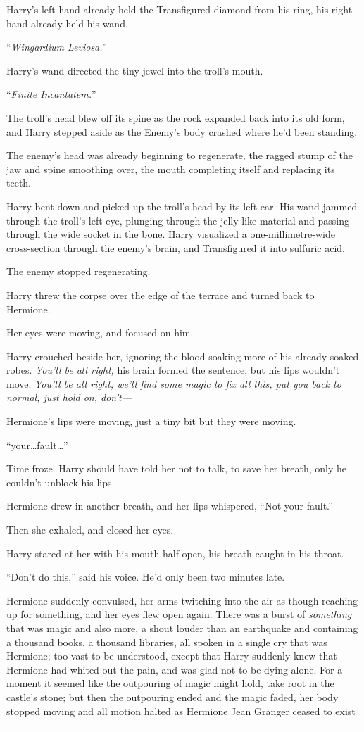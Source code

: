 Harry’s left hand already held the Transfigured diamond from his ring, his right hand already held his wand.

“\emph{Wingardium Leviosa.}”

Harry’s wand directed the tiny jewel into the troll’s mouth.

“\emph{Finite Incantatem.}”

The troll’s head blew off its spine as the rock expanded back into its old form, and Harry stepped aside as the Enemy’s body crashed where he’d been standing.

The enemy’s head was already beginning to regenerate, the ragged stump of the jaw and spine smoothing over, the mouth completing itself and replacing its teeth.

Harry bent down and picked up the troll’s head by its left ear. His wand jammed through the troll’s left eye, plunging through the jelly-like material and passing through the wide socket in the bone. Harry visualized a one-millimetre-wide cross-section through the enemy’s brain, and Transfigured it into sulfuric acid.

The enemy stopped regenerating.

Harry threw the corpse over the edge of the terrace and turned back to Hermione.

Her eyes were moving, and focused on him.

Harry crouched beside her, ignoring the blood soaking more of his already-soaked robes. \emph{You’ll be all right,} his brain formed the sentence, but his lips wouldn’t move. \emph{You’ll be all right, we’ll find some magic to fix all this, put you back to normal, just hold on, don’t—}

Hermione’s lips were moving, just a tiny bit but they were moving.

“your…fault…”

Time froze. Harry should have told her not to talk, to save her breath, only he couldn’t unblock his lips.

Hermione drew in another breath, and her lips whispered, “Not your fault.”

Then she exhaled, and closed her eyes.

Harry stared at her with his mouth half-open, his breath caught in his throat.

“Don’t do this,” said his voice. He’d only been two minutes late.

Hermione suddenly convulsed, her arms twitching into the air as though reaching up for something, and her eyes flew open again. There was a burst of \emph{something} that was magic and also more, a shout louder than an earthquake and containing a thousand books, a thousand libraries, all spoken in a single cry that was Hermione; too vast to be understood, except that Harry suddenly knew that Hermione had whited out the pain, and was glad not to be dying alone. For a moment it seemed like the outpouring of magic might hold, take root in the castle’s stone; but then the outpouring ended and the magic faded, her body stopped moving and all motion halted as Hermione Jean Granger ceased to exist—


